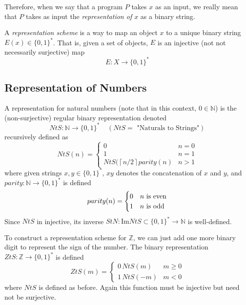\documentclass{article}
\begin{document}
  Therefore, when we say that a program $P$ takes $x$ as an input, we really mean that $P$ takes as input the \textit{representation of $x$} as a binary string.  

  \begin{definition}
  A \textit{representation scheme} is a way to map an object $x$ to a unique binary string $E(x) \in \{0,1\}^\ast$. That is, given a set of objects, $E$ is an injective (not not necessarily surjective) map
  \begin{equation}
    E: X \longrightarrow \{0,1\}^\ast
  \end{equation}
  \end{definition}

  \subsection{Representation of Numbers}
  \begin{definition}
  A representation for natural numbers (note that in this context, $0 \in \mathbb{N}$) is the (non-surjective) regular binary representation denoted
  \begin{equation}
    NtS: \mathbb{N} \longrightarrow \{0,1\}^\ast \;\;\;\; (NtS= \text{ "Naturals to Strings"})
  \end{equation}
  recursively defined as 
  \[NtS(n) = \begin{cases}
  0 & n = 0 \\
  1 & n = 1 \\
  NtS(\left \lceil{n/2}\right \rceil parity(n) & n > 1 
  \end{cases}\]
  where given strings $x, y \in \{0,1\}^\ast$, $xy$ denotes the concatenation of $x$ and $y$, and $parity: \mathbb{N} \longrightarrow \{0,1\}^\ast$ is defined 
  \[parity(n) = \begin{cases}
  0 & n $\text{ is even}$ \\
  1 & n $\text{ is odd}$
  \end{cases}\]
  Since $NtS$ in injective, its inverse $StN: \mathrm{Im}{NtS} \subset \{0,1\}^\ast \longrightarrow \mathbb{N}$ is well-defined. 
  \end{definition}

  \begin{definition}
  To construct a representation scheme for $\mathbb{Z}$, we can just add one more binary digit to represent the sign of the number. The binary representation $ZtS: \mathbb{Z} \longrightarrow \{0, 1\}^\ast$ is defined
  \[ZtS(m) = \begin{cases}
  0\, NtS(m) & m \geq 0 \\
  1 \, NtS(-m) & m < 0
  \end{cases}\]
  where $NtS$ is defined as before. Again this function must be injective but need not be surjective. 
  \end{definition}
\end{document}
